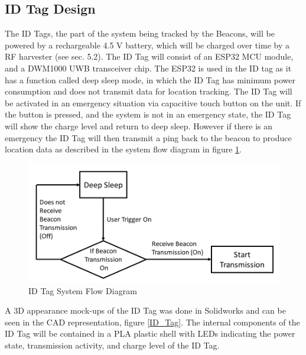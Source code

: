 \pagebreak
\subsection{ID Tag Design}
The ID Tags, the part of the system being tracked by the Beacons, will be powered by a rechargeable 4.5 V battery, which will be charged over time by a RF harvester (see sec. 5.2). The ID Tag will consist of an ESP32 MCU module, and a DWM1000 UWB transceiver chip. The ESP32 is used in the ID tag as it has a function called deep sleep mode, in which the ID Tag has minimum power consumption and does not transmit data for  location tracking. The ID Tag will be activated in an emergency situation via capacitive touch button on the unit. If the button is pressed, and the system is not in an emergency state, the ID Tag will show the charge level and return to deep sleep. However if there is an emergency the ID Tag will then transmit a ping back to the beacon to produce location data as described in the system flow diagram in figure \ref{id_flow}. 

\medskip
\begin{figure}[H]
\centering
    \includegraphics[scale=0.50]{./images/id_flow.png}
    \caption{ID Tag System Flow Diagram}
    \label{id_flow}
\end{figure}
\medskip

A 3D appearance mock-ups of the ID Tag was done in Solidworks and can be seen in the CAD representation, figure \ref{ID_Tag}. The internal components of the ID Tag will be contained in a PLA plastic shell with LEDs indicating the power state, transmission activity, and charge level of the ID Tag. 

